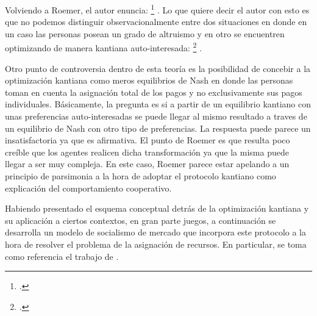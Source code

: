 Volviendo a Roemer, el autor enuncia: \footnote{ \citep[p. 85]{Roemer_2019}.} \citep[p. 85]{Roemer_2019}. Lo que quiere decir el autor con esto es que no podemos distinguir observacionalmente entre dos situaciones en donde en un caso las personas posean un grado de altruismo y en otro se encuentren optimizando de manera kantiana auto-interesada: \footnote{ \citep[p. 86]{Roemer_2019}.} \citep[p. 86]{Roemer_2019}.

Otro punto de controversia dentro de esta teoría es la posibilidad de concebir a la optimización kantiana como meros equilibrios de Nash en donde las personas toman en cuenta la asignación total de los pagos y no exclusivamente sus pagos individuales. Básicamente, la pregunta es si a partir de un equilibrio kantiano con unas preferencias auto-interesadas se puede llegar al mismo resultado a traves de un equilibrio de Nash con otro tipo de preferencias. La respuesta puede parece un insatisfactoria ya que es afirmativa. El punto de Roemer es que resulta poco creíble que los agentes realicen dicha transformación ya que la misma puede llegar a ser muy compleja. En este caso, Roemer parece estar apelando a un principio de parsimonia a la hora de adoptar el protocolo kantiano como explicación del comportamiento cooperativo.

Habiendo presentado el esquema conceptual detrás de la optimización kantiana y su aplicación a ciertos contextos, en gran parte juegos, a continuación se desarrolla un modelo de socialismo de mercado que incorpora este protocolo a la hora de resolver el problema de la asignación de recursos. En particular, se toma como referencia el trabajo de \citet{Roemer_2021a}. 

